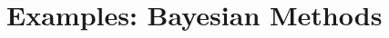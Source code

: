 \documentclass[thesis.tex]{subfiles}
\newcommand{\p}[1]{p\left({#1}\right)}
\begin{document}
%
%
%
%
%


\section{Examples: Bayesian Methods}
\label{sec:merge:bayes}

\end{document}
